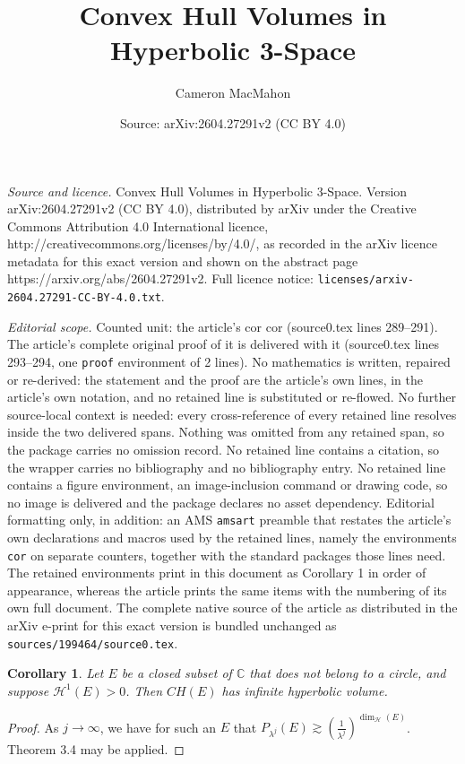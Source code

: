 \documentclass[10pt,a4paper]{amsart}
\title{Convex Hull Volumes in Hyperbolic 3-Space}
\author{Cameron MacMahon}
\date{Source: arXiv:2604.27291v2 (CC BY 4.0)}
\newtheorem{cor}{Corollary}
\newcommand\comp{{\mathbb{C}}}
\begin{document}
\maketitle

\noindent\emph{Source and licence.} Convex Hull Volumes in Hyperbolic 3-Space. Version arXiv:2604.27291v2 (CC BY 4.0), distributed by arXiv under the Creative Commons Attribution 4.0 International licence, http://creativecommons.org/licenses/by/4.0/, as recorded in the arXiv licence metadata for this exact version and shown on the abstract page https://arxiv.org/abs/2604.27291v2. Full licence notice: \texttt{licenses/arxiv-2604.27291-CC-BY-4.0.txt}.\par\smallskip

\noindent\textit{Editorial scope.} Counted unit: the article's cor cor (source0.tex lines 289--291). The article's complete original proof of it is delivered with it (source0.tex lines 293--294, one \texttt{proof} environment of 2 lines). No mathematics is written, repaired or re-derived: the statement and the proof are the article's own lines, in the article's own notation, and no retained line is substituted or re-flowed.  No further source-local context is needed: every cross-reference of every retained line resolves inside the two delivered spans.  Nothing was omitted from any retained span, so the package carries no omission record.  No retained line contains a citation, so the wrapper carries no bibliography and no bibliography entry.  No retained line contains a figure environment, an image-inclusion command or drawing code, so no image is delivered and the package declares no asset dependency.  Editorial formatting only, in addition: an AMS \texttt{amsart} preamble that restates the article's own declarations and macros used by the retained lines, namely the environments \texttt{cor} on separate counters, together with the standard packages those lines need.  The retained environments print in this document as Corollary 1 in order of appearance, whereas the article prints the same items with the numbering of its own full document.  The complete native source of the article as distributed in the arXiv e-print for this exact version is bundled unchanged as \texttt{sources/199464/source0.tex}.
 \begin{cor}
     Let $E$  be a closed subset of $\comp$ that does not belong to a circle, and suppose $\mathcal{H}^1(E) > 0$. Then $CH(E)$ has infinite hyperbolic volume. 
 \end{cor}

 \begin{proof} As $j\rightarrow \infty$, we have for such an $E$ that $P_{\lambda^j}(E) \gtrsim (\frac{1}{\lambda^j})^{\dim_{\mathcal{H}}(E)}$. Theorem 3.4 may be applied.
 \end{proof}
\end{document}
